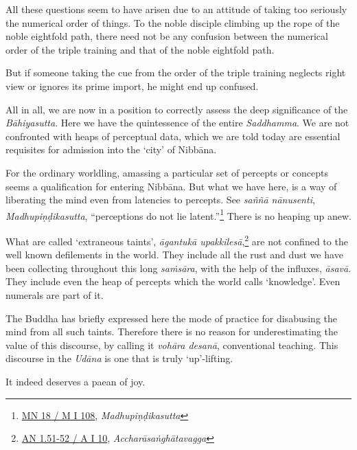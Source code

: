 All these questions seem to have arisen due to an attitude of taking too seriously the numerical order of things. To the noble disciple climbing up the rope of the noble eightfold path, there need not be any confusion between the numerical order of the triple training and that of the noble eightfold path.

But if someone taking the cue from the order of the triple training neglects right view or ignores its prime import, he might end up confused.

All in all, we are now in a position to correctly assess the deep significance of the \emph{Bāhiyasutta}. Here we have the quintessence of the entire \emph{Saddhamma}. We are not confronted with heaps of perceptual data, which we are told today are essential requisites for admission into the `city' of Nibbāna.

For the ordinary worldling, amassing a particular set of percepts or concepts seems a qualification for entering Nibbāna. But what we have here, is a way of liberating the mind even from latencies to percepts. See \emph{saññā nānusenti}, \emph{Madhupiṇḍikasutta}, ``perceptions do not lie latent.''\footnote{\href{https://suttacentral.net/mn18/pli/ms}{MN 18 / M I 108}, \emph{Madhupiṇḍikasutta}} There is no heaping up anew.

What are called `extraneous taints', \emph{āgantukā upakkilesā},\footnote{\href{https://suttacentral.net/an1.51-60/pli/ms}{AN 1.51-52 / A I 10}, \emph{Accharāsaṅghātavagga}} are not confined to the well known defilements in the world. They include all the rust and dust we have been collecting throughout this long \emph{saṁsāra}, with the help of the influxes, \emph{āsavā}. They include even the heap of percepts which the world calls `knowledge'. Even numerals are part of it.

The Buddha has briefly expressed here the mode of practice for disabusing the mind from all such taints. Therefore there is no reason for underestimating the value of this discourse, by calling it \emph{vohāra desanā}, conventional teaching. This discourse in the \emph{Udāna} is one that is truly `up'-lifting.

It indeed deserves a paean of joy.
